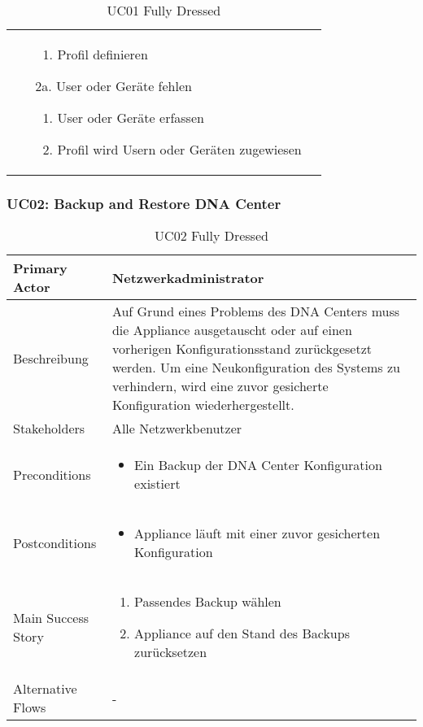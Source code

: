 \begin{table}[H]
\begin{tabularx}{\textwidth}{l | X}
\begin{itemize}
\begin{enumerate}
				\item Profil definieren
			\end{enumerate}
			\item[2a.] User oder Geräte fehlen
			\begin{enumerate}
				\item User oder Geräte erfassen
				\item Profil wird Usern oder Geräten zugewiesen
			\end{enumerate}
		\end{itemize}
	\end{tabularx}
	\caption{UC01 Fully Dressed}
	\label{tab:UC01}
\end{table}

\subsubsection{UC02: Backup and Restore DNA Center}
\begin{table}[H]
	\centering
	\begin{tabularx}{\textwidth}{l | X}
		Primary Actor   & Netzwerkadministrator        \\
		\hline
		Beschreibung   & Auf Grund eines Problems des DNA Centers muss die Appliance ausgetauscht oder auf einen vorherigen Konfigurationsstand zurückgesetzt werden. Um eine Neukonfiguration des Systems zu verhindern, wird eine zuvor gesicherte Konfiguration wiederhergestellt.  \\ 
		\hline
		Stakeholders       & Alle Netzwerkbenutzer \\ 
		Preconditions      &
		\begin{itemize}	
			\item Ein Backup der DNA Center Konfiguration existiert
		\end{itemize}  \\
		\hline
		Postconditions     & 
		\begin{itemize}	
			\item Appliance läuft mit einer zuvor gesicherten Konfiguration
		\end{itemize}  \\
		\hline
		Main Success Story & 
		\begin{enumerate}
			\item Passendes Backup wählen
			\item Appliance auf den Stand des Backups zurücksetzen
		\end{enumerate}
		\\
		\hline
		Alternative Flows  & -
	\end{tabularx}
	\caption{UC02 Fully Dressed}
	\label{tab:UC02}
\end{table}


